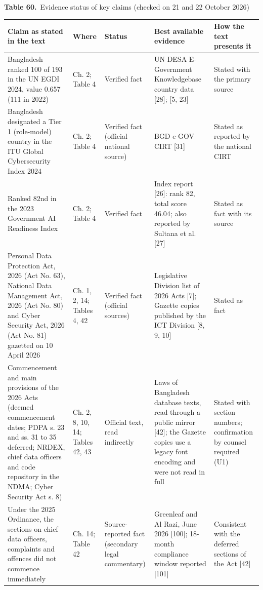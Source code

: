 \documentclass[border=10pt]{standalone}
\begin{document}
\begin{minipage}{17cm}
{\large\bfseries Table 60.}\ {\large Evidence status of key claims (checked on 21 and 22 October 2026)}\par\vspace{7pt}
\small
{}
\begin{tabularx}{\linewidth}{@{}>{\hsize=1.275\hsize\raggedright\arraybackslash}X>{\hsize=0.637\hsize\raggedright\arraybackslash}X>{\hsize=0.735\hsize\raggedright\arraybackslash}X>{\hsize=1.275\hsize\raggedright\arraybackslash}X>{\hsize=1.078\hsize\raggedright\arraybackslash}X@{}}
\arrayrulecolor{bapilrule}\toprule
\rowcolor{white}\textbf{Claim as stated in the text} & \textbf{Where} & \textbf{Status} & \textbf{Best available evidence} & \textbf{How the text presents it} \\
\midrule
Bangladesh ranked 100 of 193 in the UN EGDI 2024, value 0.657 (111 in 2022) & Ch. 2; Table 4 & Verified fact & UN DESA E-Government Knowledgebase country data [28]; [5, 23] & Stated with the primary source \\
Bangladesh designated a Tier 1 (role-model) country in the ITU Global Cybersecurity Index 2024 & Ch. 2; Table 4 & Verified fact (official national source) & BGD e-GOV CIRT [31] & Stated as reported by the national CIRT \\
Ranked 82nd in the 2023 Government AI Readiness Index & Ch. 2; Table 4 & Verified fact & Index report [26]: rank 82, total score 46.04; also reported by Sultana et al. [27] & Stated as fact with its source \\
Personal Data Protection Act, 2026 (Act No. 63), National Data Management Act, 2026 (Act No. 80) and Cyber Security Act, 2026 (Act No. 81) gazetted on 10 April 2026 & Ch. 1, 2, 14; Tables 4, 42 & Verified fact (official sources) & Legislative Division list of 2026 Acts [7]; Gazette copies published by the ICT Division [8, 9, 10] & Stated as fact \\
Commencement and main provisions of the 2026 Acts (deemed commencement dates; PDPA s. 23 and ss. 31 to 35 deferred; NRDEX, chief data officers and code repository in the NDMA; Cyber Security Act s. 8) & Ch. 2, 8, 10, 14; Tables 42, 43 & Official text, read indirectly & Laws of Bangladesh database texts, read through a public mirror [42]; the Gazette copies use a legacy font encoding and were not read in full & Stated with section numbers; confirmation by counsel required (U1) \\
Under the 2025 Ordinance, the sections on chief data officers, complaints and offences did not commence immediately & Ch. 14; Table 42 & Source-reported fact (secondary legal commentary) & Greenleaf and Al Razi, June 2026 [100]; 18-month compliance window reported [101] & Consistent with the deferred sections of the Act [42] \\

\end{tabularx}
\end{minipage}
\end{document}
